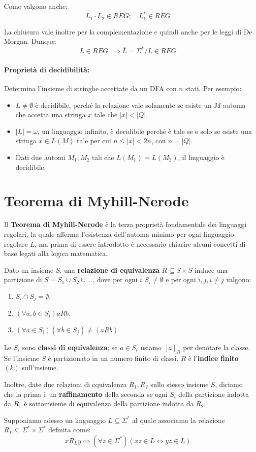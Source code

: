 \noindent Come valgono anche: \[
	L_1\cdot L_2\in REG;\quad L_1^*\in REG
\]

\noindent La chiusura vale inoltre per la complementazione e quindi anche per le leggi di De Morgan. Dunque: \[
	L\in REG \implies \overline{L} = \Sigma^* / L\in REG
\]

\paragraph{Proprietà di decidibilità:} Determina l'insieme di stringhe accettate da un DFA con $n$ stati. Per esempio: \begin{itemize}
	\item $L \neq \emptyset$ è decidibile, perché la relazione vale solamente se esiste un $M$ automa che accetta una stringa $x$ tale che $|x| < |Q|$.
	\item $|L| = \omega$, un linguaggio infinito, è decidibile perché è tale se e solo se esiste una stringa $x\in L(M)$ tale per cui $n\leq |x| < 2n$,
    con $n = |Q|$.
	\item Dati due automi $M_1, M_2$ tali che $L(M_1) = L(M_2)$, il linguaggio è decidibile.
\end{itemize}

%

\section{Teorema di Myhill-Nerode}
Il \textbf{Teorema di Myhill-Nerode} è la terza proprietà fondamentale dei linguaggi regolari, la quale afferma l'esistenza dell'automa minimo per ogni
linguaggio regolare $L$, ma prima di essere introdotto è necessario chiarire alcuni concetti di base legati alla logica matematica.\par
Dato un insieme $S$, una \textbf{relazione di equivalenza} $R\subseteq S\times S$ induce una partizione di $S = S_1\cup S_2\cup ...$, dove per ogni $i$
$S_i\neq\emptyset$ e per ogni $i, j, i\neq j$ valgono: \begin{enumerate}
    \item $S_i\cap S_j = \emptyset$.
    \item $(\forall a, b\in S_i)a R b$.
    \item $(\forall a\in S_i)(\forall b\in S_j)\neq(a R b)$
\end{enumerate}

\noindent Le $S_i$ sono \textbf{classi di equivalenza}; se $a\in S_i$ usiamo $[a]_R$ per denotare la classe. Se l'insieme $S$ è partizionato in un
numero finito di classi, $R$ è l'\textbf{indice finito} $(k)$ sull'insieme.\par
Inoltre, date due relazioni di equivalenza $R_1, R_2$ sullo stesso insieme $S$, diciamo che la prima è un \textbf{raffinamento} della seconda se ogni
$S_i$ della partizione indotta da $R_1$ è sottoinsieme di equivalenza della partizione indotta da $R_2$.\par
Supponiamo adesso un linguaggio $L\subseteq \Sigma^*$ al quale associamo la relazione $R_L\subseteq \Sigma^*\times \Sigma^*$ definita come: \[
    xR_Ly \iff (\forall z\in \Sigma^*)(xz\in L \iff yz\in L)
\]

